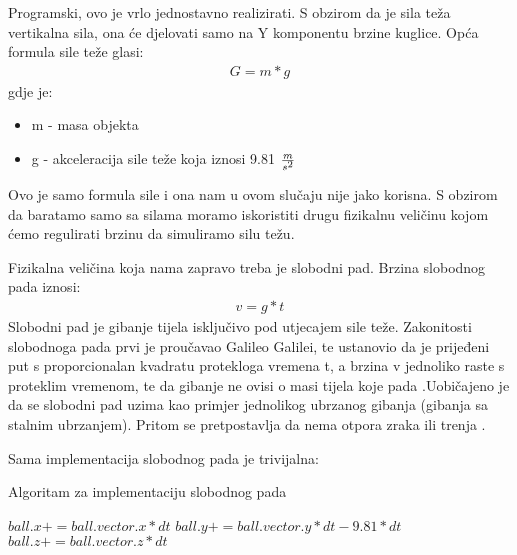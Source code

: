 Programski, ovo je vrlo jednostavno realizirati. S obzirom da je sila teža vertikalna sila, ona će djelovati samo na Y komponentu brzine kuglice. Opća formula sile teže glasi:
\begin{equation} \label{equ:sila_teza}
	\begin{aligned}
		G = m * g
	\end{aligned}
\end{equation}
gdje je:
\begin{itemize}
	\item m - masa objekta
	\item g - akceleracija sile teže koja iznosi 9.81 $\frac{m}{s\textsuperscript{2}}$
\end{itemize}
Ovo je samo formula sile i ona nam u ovom slučaju nije jako korisna. S obzirom da baratamo samo sa silama moramo iskoristiti drugu fizikalnu veličinu kojom ćemo regulirati brzinu da simuliramo silu težu. 

Fizikalna veličina koja nama zapravo treba je slobodni pad. Brzina slobodnog pada iznosi:
\begin{equation}\label{slobodni_pad}
	\begin{aligned}
		v = g * t
	\end{aligned}
\end{equation}
Slobodni pad je gibanje tijela isključivo pod utjecajem sile teže. Zakonitosti slobodnoga pada prvi je proučavao Galileo Galilei, te ustanovio da je prijeđeni put s proporcionalan kvadratu protekloga vremena t, a brzina v jednoliko raste s proteklim vremenom, te da gibanje ne ovisi o masi tijela koje pada \cite{10}.Uobičajeno je da se slobodni pad uzima kao primjer jednolikog ubrzanog gibanja (gibanja sa stalnim ubrzanjem). Pritom se pretpostavlja da nema otpora zraka ili trenja \cite{10}.

Sama implementacija slobodnog pada je trivijalna:
\begin{algorithm}
	\caption{Algoritam za implementaciju slobodnog pada}
	\label{alg:free_fall}
	\begin{algorithmic}
		\State $ball.x += ball.vector.x * dt$
		\State $ball.y += ball.vector.y * dt - 9.81 * dt$
		\State $ball.z += ball.vector.z * dt$
		\EndFunction
	\end{algorithmic}
\end{algorithm}

